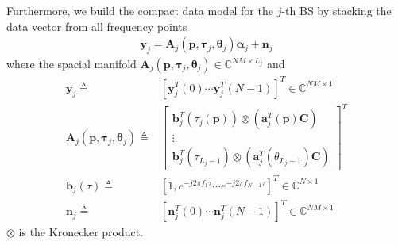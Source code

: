 \documentclass[journal]{IEEEtran}
\begin{document}
Furthermore, we build the compact data model for the $j$-th BS by stacking the data vector from all frequency points
\begin{align}\label{CFR_NM0}
  \boldsymbol{y}_j=\boldsymbol{A}_j(\boldsymbol{p},\boldsymbol{\tau}_j,\boldsymbol{\theta}_j)\boldsymbol{\alpha}_j+\boldsymbol{n}_j
\end{align} 
where the spacial manifold $\boldsymbol{A}_j(\boldsymbol{p},\boldsymbol{\tau}_j,\boldsymbol{\theta}_j)\in \mathbb{C}^{NM\times L_j}$ and
\begin{align}\label{CFR_NM1}
  \boldsymbol{y}_j\triangleq& [\boldsymbol{y}_j^T(0)\cdots \boldsymbol{y}_j^T(N-1)]^T \in \mathbb{C}^{NM \times 1}\\ \nonumber
  \boldsymbol{A}_j(\boldsymbol{p},\boldsymbol{\tau}_j,\boldsymbol{\theta}_j)\triangleq&\left[
  \begin{array}{c}
    \boldsymbol{b}^T_j(\tau_j(\boldsymbol{p}))\otimes (\boldsymbol{a}^T_j(\boldsymbol{p})\boldsymbol{C})\\
    \vdots\\
    \boldsymbol{b}^T_j(\tau_{L_j-1})\otimes (\boldsymbol{a}^T_j(\theta_{L_j-1})\boldsymbol{C})
  \end{array}\right]^T\\ \nonumber
  \boldsymbol{b}_j(\tau)\triangleq& [1,e^{-j2\pi f_1 \tau} \cdots e^{-j2\pi f_{N-1} \tau}]^T\in \mathbb{C}^{N\times 1}\\ \nonumber
  \boldsymbol{n}_j\triangleq& [\boldsymbol{n}_j^T(0)\cdots \boldsymbol{n}_j^T(N-1)]^T\in \mathbb{C}^{NM \times 1}
\end{align}
$\otimes$ is the Kronecker product.
\end{document}
